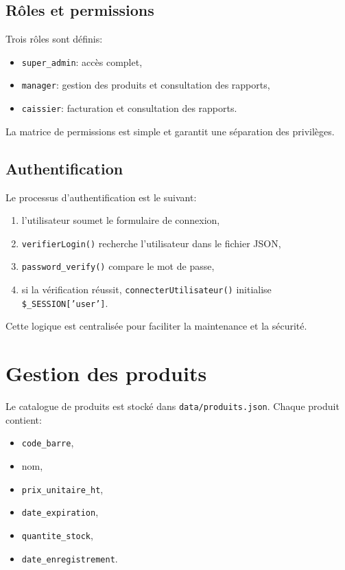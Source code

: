 \documentclass[12pt,a4paper]{article}
\begin{document}
\subsection{Rôles et permissions}
Trois rôles sont définis:
\begin{itemize}
  \item \texttt{super\_admin}: accès complet,
  \item \texttt{manager}: gestion des produits et consultation des rapports,
  \item \texttt{caissier}: facturation et consultation des rapports.
\end{itemize}

La matrice de permissions est simple et garantit une séparation des privilèges.

\subsection{Authentification}
Le processus d'authentification est le suivant:
\begin{enumerate}
  \item l'utilisateur soumet le formulaire de connexion,
  \item \texttt{verifierLogin()} recherche l'utilisateur dans le fichier JSON,
  \item \texttt{password\_verify()} compare le mot de passe,
  \item si la vérification réussit, \texttt{connecterUtilisateur()} initialise \texttt{\$\_SESSION['user']}.
\end{enumerate}

Cette logique est centralisée pour faciliter la maintenance et la sécurité.

\section{Gestion des produits}
Le catalogue de produits est stocké dans \texttt{data/produits.json}. Chaque produit contient:
\begin{itemize}
  \item \texttt{code\_barre},
  \item nom,
  \item \texttt{prix\_unitaire\_ht},
  \item \texttt{date\_expiration},
  \item \texttt{quantite\_stock},
  \item \texttt{date\_enregistrement}.
\end{itemize}
\end{document}
